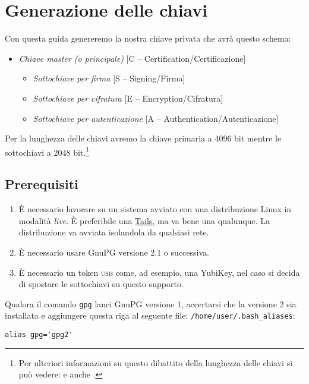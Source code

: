 \section{Generazione delle chiavi}

Con questa guida genereremo la nostra chiave privata che avrà questo schema:

\begin{itemize}
    \item \emph{Chiave master (o principale)} [C -- Certification/Certificazione]
    \begin{itemize}
        \item \emph{Sottochiave per firma} [S -- Signing/Firma]
        \item \emph{Sottochiave per cifratura} [E -- Encryption/Cifratura]
        \item \emph{Sottochiave per autenticazione} [A --
    Authentication/Autenticazione]
    \end{itemize}
\end{itemize}

Per la lunghezza delle chiavi avremo la chiave primaria a 4096 bit
mentre le sottochiavi a 2048 bit.\footnote{Per ulteriori informazioni su questo
dibattito della lunghezza delle chiavi si può vedere: \cite{gnupg:keylength} e
anche \cite{yubico:keylength}.}

\subsection{Prerequisiti}

\begin{enumerate}
 \item È necessario lavorare su un sistema avviato con una distribuzione Linux
 in modalità \textit{live}. È preferibile una
 \href{https://tails.boum.org/index.it.html}{Tails}, ma va bene una qualunque.
 La distribuzione va avviata isolandola da qualsiasi rete.
 \item È necessario usare GnuPG versione 2.1 o successiva.
 \item È necessario un token \textsc{usb} come, ad esempio, una YubiKey, nel
 caso si decida di spostare le sottochiavi su questo supporto.
\end{enumerate}

Qualora il comando \texttt{gpg} lanci GnuPG versione 1, accertarsi che
la versione 2 sia installata e aggiungere questa riga al seguente file:
\texttt{/home/user/.bash\_aliases}:

\begin{lstlisting}
alias gpg='gpg2'
\end{lstlisting}

